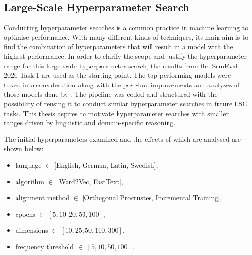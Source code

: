 \subsection{Large-Scale Hyperparameter Search}


Conducting hyperparameter searches is a common practice in machine learning to optimise performance. With many different kinds of techniques, its main aim is to find the combination of hyperparameters that will result in a model with the highest performance. In order to clarify the scope and justify the hyperparameter range for this large-scale hyperparameter search, the results from the SemEval-2020 Task 1 are used as the starting point. The top-performing models were taken into consideration along with the post-hoc improvements and analyses of those models done by \citet{kaiser-etal-2020-ims}. The pipeline was coded and structured with the possibility of reusing it to conduct similar hyperparameter searches in future LSC tasks. This thesis aspires to motivate hyperparameter searches with smaller ranges driven by linguistic and domain-specific reasoning.





The initial hyperparameters examined and the effects of which are analysed are shown below:
\begin{itemize}
    \item language $\in$ [English, German, Latin, Swedish],
    \item algorithm $\in$ [Word2Vec, FastText],
    \item alignment method $\in$ [Orthogonal Procrustes, Incremental Training],
    \item epochs $\in$ $[5, 10, 20, 50, 100]$,
    \item dimensions $\in$ $[10, 25, 50, 100, 300]$,
    \item frequency threshold $\in$ $[5, 10, 50, 100]$.
\end{itemize}%


